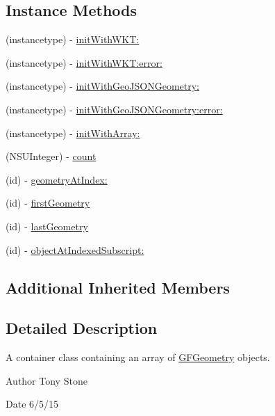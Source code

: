 \subsection*{Instance Methods}
\begin{DoxyCompactItemize}
\item 
(instancetype) -\/ \hyperlink{interface_g_f_geometry_collection_a13156620e5298fe7d286bb800df4097b}{init\+With\+W\+K\+T\+:}
\item 
(instancetype) -\/ \hyperlink{interface_g_f_geometry_collection_ab9106d38d85940ef0bfa6eeb89d90193}{init\+With\+W\+K\+T\+:error\+:}
\item 
(instancetype) -\/ \hyperlink{interface_g_f_geometry_collection_adc8a317a694f82808d1e02e53e300f8f}{init\+With\+Geo\+J\+S\+O\+N\+Geometry\+:}
\item 
(instancetype) -\/ \hyperlink{interface_g_f_geometry_collection_a74b596f60b3363bb9f06b06847cb086d}{init\+With\+Geo\+J\+S\+O\+N\+Geometry\+:error\+:}
\item 
(instancetype) -\/ \hyperlink{interface_g_f_geometry_collection_a260bb3daa9d3324cb1cc2fa9ef3a61e9}{init\+With\+Array\+:}
\item 
(N\+S\+U\+Integer) -\/ \hyperlink{interface_g_f_geometry_collection_a020dd5245b572a391ccbd1ea92699240}{count}
\item 
(id) -\/ \hyperlink{interface_g_f_geometry_collection_a4cd182279facec2850b47634aa0f6297}{geometry\+At\+Index\+:}
\item 
(id) -\/ \hyperlink{interface_g_f_geometry_collection_a610f72a22d76a3ce6c9eaeb2dad35c0e}{first\+Geometry}
\item 
(id) -\/ \hyperlink{interface_g_f_geometry_collection_a89b3b6e2097cf5899a6d635ddcb95ef3}{last\+Geometry}
\item 
(id) -\/ \hyperlink{interface_g_f_geometry_collection_ac67dd4526580a8a38408e39c489a7503}{object\+At\+Indexed\+Subscript\+:}
\end{DoxyCompactItemize}
\subsection*{Additional Inherited Members}


\subsection{Detailed Description}
A container class containing an array of \hyperlink{interface_g_f_geometry}{G\+F\+Geometry} objects. 

\begin{DoxyAuthor}{Author}
Tony Stone 
\end{DoxyAuthor}
\begin{DoxyDate}{Date}
6/5/15 
\end{DoxyDate}



